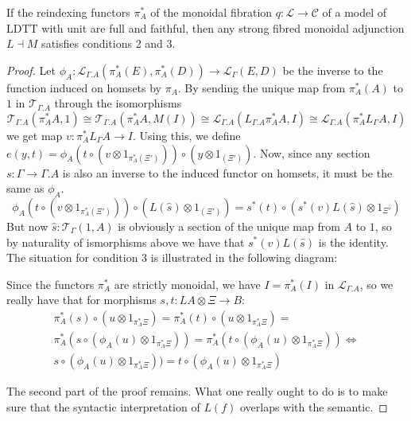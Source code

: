 \begin{thm}If the reindexing functors $\pi_A^*$ of the monoidal fibration $q : \mathcal{L} \to \mathcal{C}$ of a model of LDTT with unit are full and faithful, then any strong fibred monoidal adjunction $L \dashv M$ satisfies conditions 2 and 3.
  \begin{proof}
    Let $\phi_A : \mathcal{L}_{\Gamma.A}(\pi^*_A(E),\pi^*_A(D)) \to \mathcal{L}_\Gamma(E, D)$ be the inverse to the function induced on homsets by $\pi_A$. By sending the unique map from $\pi^*_A(A)$ to $1$ in $\mathcal{T}_{\Gamma.A}$ through the isomorphisms
    \[
      \mathcal{T}_{\Gamma.A}(\pi^*_AA,1) \cong \mathcal{T}_{\Gamma.A}(\pi^*_AA,M(I)) \cong \mathcal{L}_{\Gamma.A}(L_{\Gamma.A}\pi^*_AA,I) \cong \mathcal{L}_{\Gamma.A}(\pi^*_AL_{\Gamma}A,I)
    \]
    we get map $v : \pi^*_AL_\Gamma A \to I$. Using this, we define $e(y,t) = \phi_A(t \circ (v \otimes 1_{\pi^*_A(\Xi')})) \circ (y \otimes 1_{(\Xi')})$. Now, since any section $s : \Gamma \to \Gamma.A$ is also an inverse to the induced functor on homsets, it must be the same as $\phi_A$.
    \[
      \phi_A(t \circ (v \otimes 1_{\pi^*_A(\Xi')}))\circ (L(\hat s) \otimes 1_{(\Xi')}) = s^*(t) \circ (s^*(v)L(\hat s) \otimes 1_{\Xi'})
    \]
    But now $\hat s : \mathcal{T}_{\Gamma}(1, A)$ is obviously a section of the unique map from $A$ to $1$, so by naturality of ismorphisms above we have that $s^*(v)L(\hat s)$ is the identity.\\
    The situation for condition 3 is illustrated in the following diagram:

    Since the functors $\pi_A^*$ are strictly monoidal, we have $I = \pi_A^*(I)$ in $\mathcal{L}_{\Gamma.A}$, so we really have that for morphisms $s, t : LA \otimes \Xi \to B$:
    \[
      \begin{split}
      \pi_A^*(s) \circ (u \otimes 1_{\pi_A^* \Xi}) = \pi_A^*(t) \circ (u \otimes 1_{\pi_A^* \Xi}) =\\
      \pi_A^*(s \circ (\phi_A(u) \otimes 1_{\pi_A^* \Xi})) = \pi_A^*(t \circ (\phi_A(u) \otimes 1_{\pi_A^* \Xi})) \iff\\
      s \circ (\phi_A(u) \otimes 1_{\pi_A^* \Xi})) = t \circ (\phi_A(u) \otimes 1_{\pi_A^* \Xi})
     \end{split}
    \]
   

    The second part of the proof remains. What one really ought to do is to make sure that the syntactic interpretation of $L(f)$ overlaps with the semantic.
  \end{proof}
\end{thm}
\begin{comment}
For compatible $M$ and $L$, there is a natural map
\[
  f : \mathcal{L}_\Gamma(LA \otimes \Xi, B) \to \mathcal{L}_{\Gamma.A}(\pi^*_A\Xi, \pi^*_AB)
\]
In order to illustrate this, first . The canonical morphism
\[
  \beta \circ ! : \pi^{*(\mathcal{T})}_AA \to 1 \to M_{\Gamma.A}(I)
\]
in $\mathcal{T}_{\Gamma.A}$ gives rise to a map $L_{\Gamma.A}\pi^{*(\mathcal{T})}_AA \to I$, which we can transform into the map $\hat f : \pi^{*(\mathcal{L})}_AL_\Gamma A \to I$. Then, we can for any map
\end{comment}


